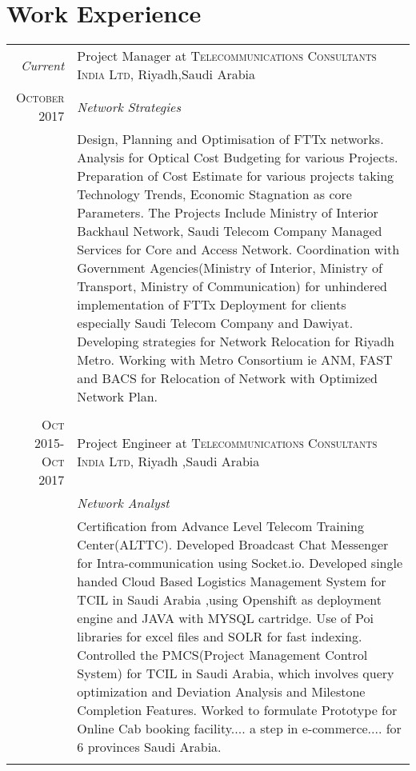 \documentclass[a4paper,10pt]{article}
\begin{document}
\section{Work Experience}
\begin{tabular}{r|p{11cm}}
 \emph{Current} & Project Manager at \textsc{Telecommunications Consultants India Ltd}, Riyadh,Saudi Arabia \\\textsc{October 2017}&\emph{Network Strategies}\\&\footnotesize{Design, Planning and Optimisation of FTTx networks.\newline
 Analysis for Optical Cost Budgeting for various Projects.\newline
 Preparation of Cost Estimate for various projects taking Technology Trends, Economic Stagnation as core Parameters. The Projects Include Ministry of Interior Backhaul Network, Saudi Telecom Company Managed Services for Core and Access Network.\newline 
 Coordination with Government Agencies(Ministry of Interior, Ministry of Transport, Ministry of Communication) for unhindered implementation of FTTx Deployment for clients especially Saudi Telecom Company and Dawiyat.\newline
 Developing strategies for Network Relocation for Riyadh Metro. Working with Metro Consortium ie ANM, FAST and BACS for Relocation of Network with Optimized Network Plan.
}\\\multicolumn{2}{c}{} \\
 \textsc{Oct 2015- Oct 2017} & Project Engineer at \textsc{Telecommunications Consultants India Ltd}, Riyadh ,Saudi Arabia \\&\emph{Network Analyst}\\&\footnotesize{ Certification from Advance Level Telecom Training Center(ALTTC).\newline
 Developed Broadcast Chat Messenger for Intra-communication using Socket.io.\newline
Developed single handed Cloud Based Logistics Management System for TCIL in Saudi Arabia ,using Openshift as deployment engine and JAVA with MYSQL cartridge. Use of Poi libraries for excel files and SOLR for fast indexing.\newline
Controlled the PMCS(Project Management Control System) for TCIL in Saudi Arabia, which involves query optimization and Deviation Analysis and Milestone Completion Features.\newline
 Worked to formulate Prototype for Online Cab booking facility.... a step in e-commerce.... for 6 provinces Saudi  Arabia.}\\\multicolumn{2}{c}{} \\

\end{tabular}
\end{document}
